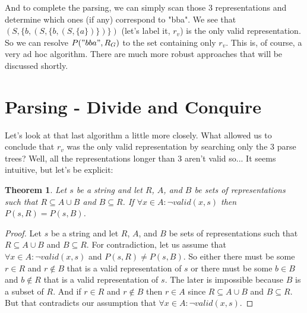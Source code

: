 \documentclass[11pt]{article}
\begin{document}
And to complete the parsing, we can simply scan those 3 representations and determine which ones (if any) correspond to "bba".
We see that $(S, \{b, (S, \{b, (S, \{a\})\})\})$ (let's label it, $r_v$) is the only valid representation.
So we can resolve $P("bba", R_G)$ to the set containing only $r_v$.
This is, of course, a very ad hoc algorithm.
There are much more robust approaches that will be discussed shortly.

\section*{Parsing - Divide and Conquire}

Let's look at that last algorithm a little more closely. What allowed us to conclude that $r_v$ was the only valid representation
by searching only the 3 parse trees? Well, all the representations longer than 3 aren't valid so... It seems intuitive, but let's be explicit:

\newtheorem{divconq}{Theorem}
\begin{divconq}
Let $s$ be a string and let $R$, $A$, and $B$ be sets of representations such that $R \subseteq A \cup B$ and $B \subseteq R$.
If $\forall x \in A : \lnot valid(x, s)$ then $P(s, R) = P(s, B)$. 
\end{divconq}
\begin{proof}
Let $s$ be a string and let $R$, $A$, and $B$ be sets of representations such that $R \subseteq A \cup B$ and $B \subseteq R$.
For contradiction, let us assume that $\forall x \in A : \lnot valid(x, s)$ and $P(s, R) \neq P(s, B)$.
So either there must be some $r \in R$ and $r \not\in B$ that is a valid representation of $s$ or there must be
some $b \in B$ and $b \not\in R$ that is a valid representation of $s$.
The later is impossible because $B$ is a subset of $R$. 
And if $r \in R$ and $r \not\in B$ then $r \in A$ since $R \subseteq A \cup B$ and $B \subseteq R$.
But that contradicts our assumption that $\forall x \in A : \lnot valid(x,s)$.
\qedhere
\end{proof}

{}

\end{document}
